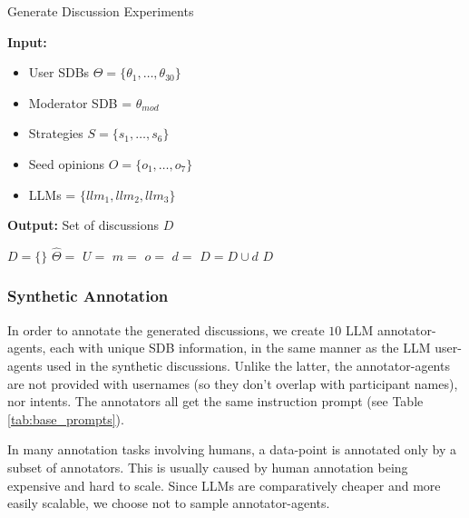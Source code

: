 \begin{algorithm}
\caption{Generate Discussion Experiments}
\label{alg:exp_generation}
\hspace*{\algorithmicindent} \textbf{Input:} 
         \begin{itemize}[noitemsep, nosep]
             \item User \acp{SDB} $\Theta = \{\theta_1, \dots, \theta_{30}\}$
             \item Moderator SDB = $\theta_{mod}$
             \item Strategies $S = \{s_1, \ldots, s_6\}$
             \item Seed opinions $O = \{o_1, \ldots, o_7\}$
             \item LLMs = $\{llm_1, llm_2, llm_3\}$
         \end{itemize}
         \hspace*{\algorithmicindent} \textbf{Output:} Set of discussions $D$
\begin{algorithmic}[1]
    \State $D = \{\}$
                \State $\hat{\Theta} = $ 
                \State $U =$  
                \State $m = $ 
                \State $o = $ 
                \State $d =$ 
                \State $D = D \cup d$
            \EndFor
        \EndFor
    \EndFor
    \State \Return $D$
\end{algorithmic}
\end{algorithm}

\subsubsection{Synthetic Annotation}

In order to annotate the generated discussions, we create $10$ \ac{LLM} annotator-agents, each with unique \ac{SDB} information, in the same manner as the \ac{LLM} user-agents used in the synthetic discussions. Unlike the latter, the annotator-agents are not provided with usernames (so they don't overlap with participant names), nor intents. The annotators all get the same instruction prompt (see Table \ref{tab:base_prompts}).

In many annotation tasks involving humans, a data-point is annotated only by a subset of annotators. This is usually caused by human annotation being expensive and hard to scale. Since \acp{LLM} are comparatively cheaper and more easily scalable, we choose not to sample annotator-agents.

